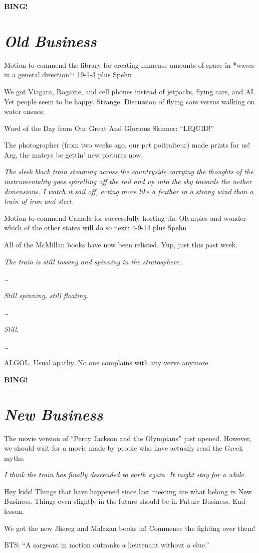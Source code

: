 \documentclass[10pt]{article}
\newcommand{\bing}{{\bf BING!} }
\newcommand{\goto}[1]{\bing \vskip 12pt \section*{{\em{#1}}}}
\newcommand{\ps}{ plus Spehn\xspace}
\begin{document}
\goto{Old Business}

Motion to commend the library for creating immense amounts of space in *waves in a general direction*: 19-1-3 \ps

We got Viagara, Rogaine, and cell phones instead of jetpacks, flying cars, and AI.  Yet people seem to be happy.  Strange.  Discussion of flying cars versus walking on water ensues.

Word of the Day from Our Great And Glorious Skinner: ``LIQUID!''

The photographer (from two weeks ago, our pet poitraiteur) made prints for us!  Arg, the mateys be gettin' new pictures now.

\textit{The sleek black train steaming across the countryside carrying the thoughts of the instrumentality goes spiralling off the rail and up into the sky towards the nether dimensions.  I watch it sail off, acting more like a feather in a strong wind than a train of iron and steel.}

Motion to commend Canada for successfully hosting the Olympics and wonder which of the other states will do so next: 4-9-14 \ps

All of the McMillan books have now been relisted.  Yup, just this past week.

\textit{The train is still tossing and spinning in the stratosphere.}

\ldots

\textit{Still spinning, still floating.}

\ldots

\textit{Still.}

\ldots

ALGOL.  Usual apathy.  No one complains with any verve anymore.

\goto{New Business}

The movie version of ``Percy Jackson and the Olympians'' just opened.  However, we should wait for a movie made by people who have actually read the Greek myths.

\textit{I think the train has finally descended to earth again.  It might stay for a while.}

Hey kids!  Things that have happened since last meeting are what belong in New Business.  Things even slightly in the future should be in Future Business.  End lesson.

We got the new Jhereg and Malazan books in!  Commence the fighting over them!

BTS: ``A sargeant in motion outranks a lieutenant without a clue.''
\end{document}
